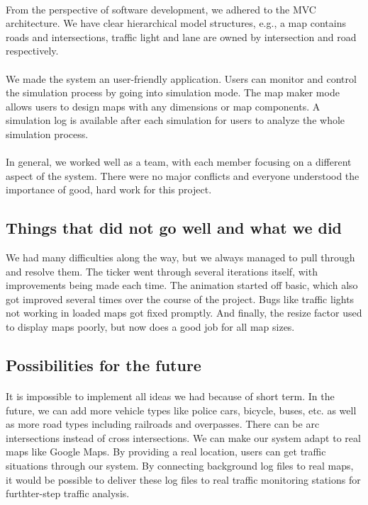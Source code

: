 \documentclass[a4paper,11pt,titlepage]{article}
\begin{document}
\paragraph{}
From the perspective of software development, we adhered to the MVC architecture. We have clear hierarchical model structures, e.g., a map contains roads and intersections, traffic light and lane are owned by intersection and road respectively.
\paragraph{}
We made the system an user-friendly application. Users can monitor and control the simulation process by going into simulation mode. The map maker mode allows users to design maps with any dimensions or map components. A simulation log is available after each simulation for users to analyze the whole simulation process. 
\paragraph{}
In general, we worked well as a team, with each member focusing on a different aspect of the system. There were no major conflicts and everyone understood the importance of good, hard work for this project.

\subsection{Things that did not go well and what we did}
We had many difficulties along the way, but we always managed to pull through and resolve them. The ticker went through several iterations itself, with improvements being made each time. The animation started off basic, which also got improved several times over the course of the project. Bugs like traffic lights not working in loaded maps got fixed promptly. And finally, the resize factor used to display maps poorly, but now does a good job for all map sizes.

\subsection{Possibilities for the future}
\paragraph{}
It is impossible to implement all ideas we had because of short term. In the future, we can add more vehicle types like police cars, bicycle, buses, etc. as well as more road types including railroads and overpasses. There can be arc intersections instead of cross intersections. We can make our system adapt to real maps like Google Maps. By providing a real location, users can get traffic situations through our system. By connecting background log files to real maps, it would be possible to deliver these log files to real traffic monitoring stations for furthter-step traffic analysis.
\end{document}
